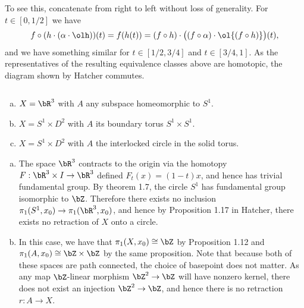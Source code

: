 \begin{homework}[e]
\begin{prf}
    To see this, concatenate from right to left without loss of generality. For $t \in [0,1/2]$ we have
    \begin{align*}
      f\circ (h\cdot (\alpha\cdot \olh))(t) = f(h(t)) = (f\circ h) \cdot \big((f\circ \alpha) \cdot \ol{(f\circ h)}\big)(t),
    \end{align*}
    and we have something similar for $t \in [1/2,3/4]$ and $t \in [3/4,1]$. As the representatives of the resulting equivalence classes above are homotopic, the diagram shown by Hatcher commutes.
\end{prf}

$ $
\begin{enumerate}[(a)]
  \item $X = \bR^3$ with $A$ any subspace homeomorphic to $S^1$.
  \item $X = S^1 \times D^2$ with $A$ its boundary torus $S^1\times S^1$.
  \item $X = S^1\times D^2$ with $A$ the interlocked circle in the solid torus.

\end{enumerate}
\begin{prf}
  \begin{enumerate}[(a)]
    \item The space $\bR^3$ contracts to the origin via the homotopy $F:\bR^3 \times I \to \bR^3$ defined $F_t(x) = (1 - t)x$, and hence has trivial fundamental group. By theorem 1.7, the circle $S^1$ has fundamental group isomorphic to $\bZ$. Therefore there exists no inclusion $\pi_1(S^1,x_0) \to \pi_1(\bR^3,x_0)$, and hence by Proposition 1.17 in Hatcher, there exists no retraction of $X$ onto a circle.

    \item In this case, we have that $\pi_1(X,x_0) \cong \bZ$ by Proposition 1.12 and $\pi_1(A,x_0) \cong \bZ\times \bZ$ by the same proposition. Note that because both of these spaces are path connected, the choice of basepoint does not matter. As any map $\bZ$-linear morphism $\bZ^2 \to \bZ$ will have nonzero kernel, there does not exist an injection $\bZ^2 \to \bZ$, and hence there is no retraction $r:A\to X$.


\end{enumerate}
\end{prf}
\end{homework}
